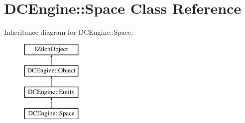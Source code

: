 \hypertarget{classDCEngine_1_1Space}{\section{D\-C\-Engine\-:\-:Space Class Reference}
\label{classDCEngine_1_1Space}
}
Inheritance diagram for D\-C\-Engine\-:\-:Space\-:\begin{figure}[H]
\begin{center}
\leavevmode
\includegraphics[height=4.000000cm]{classDCEngine_1_1Space}
\end{center}
\end{figure}
